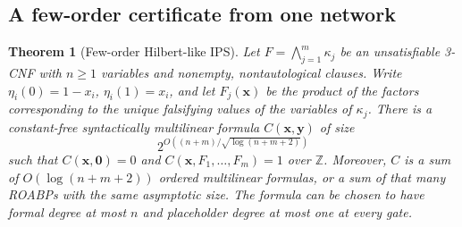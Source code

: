 \documentclass[11pt]{article}
\newtheorem{theorem}{Theorem}[section]
\theoremstyle{definition}
\theoremstyle{remark}
\begin{document}
\subsection{A few-order certificate from one network}
\begin{theorem}[Few-order Hilbert-like IPS]
\label{thm:few-order-ips}
Let $F=\bigwedge_{j=1}^m\kappa_j$ be an unsatisfiable 3-CNF with
$n\ge1$ variables and nonempty, nontautological clauses. Write
$\eta_i(0)=1-x_i$, $\eta_i(1)=x_i$, and let
$F_j(\mathbf x)$ be the product of the factors corresponding to the
unique falsifying values of the variables of $\kappa_j$.
There is a constant-free syntactically multilinear formula
$C(\mathbf x,\mathbf y)$ of size
\[
 2^{O((n+m)/\sqrt{\log(n+m+2)})}
\]
such that $C(\mathbf x,\mathbf0)=0$ and
$C(\mathbf x,F_1,\ldots,F_m)=1$ over $\mathbb Z$.
Moreover, $C$ is a sum of $O(\log(n+m+2))$ ordered multilinear
formulas, or a sum of that many ROABPs with the same asymptotic size.
The formula can be chosen to have formal degree at most $n$ and
placeholder degree at most one at every gate.
\end{theorem}
\end{document}
